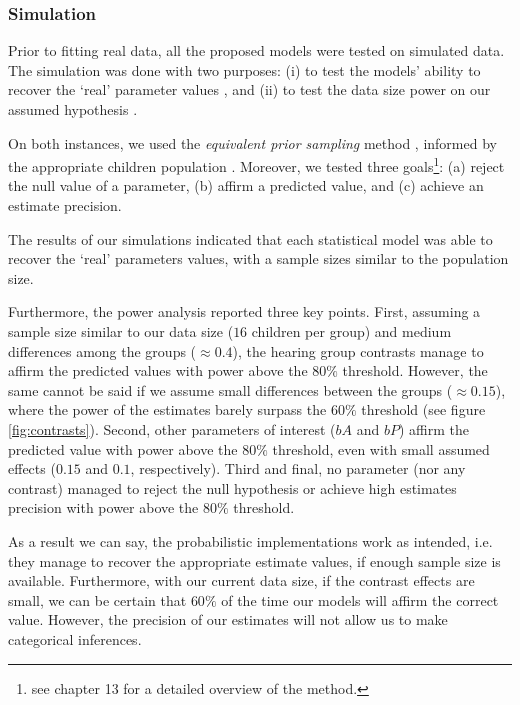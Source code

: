 \subsubsection{Simulation} \label{ssSA:model_simulation}
%
Prior to fitting real data, all the proposed models were tested on simulated data. The simulation was done with two purposes: (i) to test the models' ability to recover the `real' parameter values \cite{Fogarty_et_al_2022}, and (ii) to test the data size power on our assumed hypothesis \cite{Kruschke_2015}. 

On both instances, we used the \textit{equivalent prior sampling} method \cite{Winkler_1967}, informed by the appropriate children population \cite{DeRaeve_2016}. Moreover, we tested three goals\footnote{see \citet{Kruschke_2015} chapter 13 for a detailed overview of the method.}: (a) reject the null value of a parameter, (b) affirm a predicted value, and (c) achieve an estimate precision.

The results of our simulations indicated that each statistical model was able to recover the `real' parameters values, with a sample sizes similar to the population size.

Furthermore, the power analysis reported three key points. First, assuming a sample size similar to our data size ($16$ children per group) and medium differences among the groups ($\approx 0.4$), the hearing group contrasts manage to affirm the predicted values with power above the $80\%$ threshold. However, the same cannot be said if we assume small differences between the groups ($\approx 0.15$), where the power of the estimates barely surpass the $60\%$ threshold (see figure \ref{fig:contrasts}). Second, other parameters of interest ($bA$ and $bP$) affirm the predicted value with power above the $80\%$ threshold, even with small assumed effects ($0.15$ and $0.1$, respectively). Third and final, no parameter (nor any contrast) managed to reject the null hypothesis or achieve high estimates precision with power above the $80\%$ threshold.

As a result we can say, the probabilistic implementations work as intended, i.e. they manage to recover the appropriate estimate values, if enough sample size is available. Furthermore, with our current data size, if the contrast effects are small, we can be certain that $60\%$ of the time our models will affirm the correct value. However, the precision of our estimates will not allow us to make categorical inferences.


